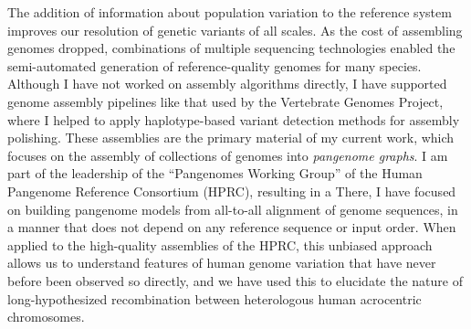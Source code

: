 \documentclass{nihbiosketch}
\begin{document}
\begin{statement}
The addition of information about population variation to the reference system improves our resolution of genetic variants of all scales.
As the cost of assembling genomes dropped, combinations of multiple sequencing technologies enabled the semi-automated generation of reference-quality genomes for many species.
Although I have not worked on assembly algorithms directly, I have supported genome assembly pipelines like that used by the Vertebrate Genomes Project, where I helped to apply haplotype-based variant detection methods for assembly polishing.
These assemblies are the primary material of my current work, which focuses on the assembly of collections of genomes into \emph{pangenome graphs}.
I am part of the leadership of the ``Pangenomes Working Group'' of the Human Pangenome Reference Consortium (HPRC), resulting in a
There, I have focused on building pangenome models from all-to-all alignment of genome sequences, in a manner that does not depend on any reference sequence or input order.
When applied to the high-quality assemblies of the HPRC, this unbiased approach allows us to understand features of human genome variation that have never before been observed so directly, and we have used this to elucidate the nature of long-hypothesized recombination between heterologous human acrocentric chromosomes.






\begin{enumerate}[label=\alph*.]


\end{enumerate}
\end{statement}
\end{document}

